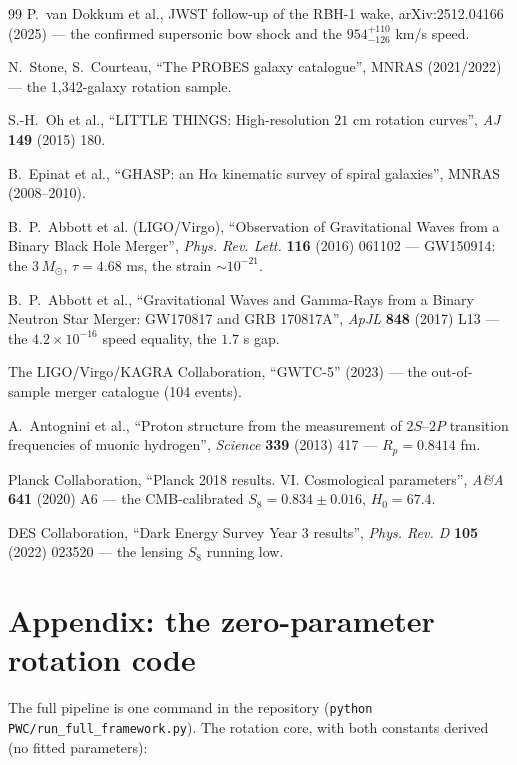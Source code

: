 \documentclass[11pt, a4paper]{article}
\begin{document}
\begin{thebibliography}{99}
 P.~van Dokkum et al., JWST follow-up of the RBH-1 wake,
arXiv:2512.04166 (2025) --- the confirmed supersonic bow shock and the
$954^{+110}_{-126}$ km/s speed.

 N.~Stone, S.~Courteau, ``The PROBES galaxy catalogue'',
MNRAS (2021/2022) --- the 1,342-galaxy rotation sample.

 S.-H.~Oh et al., ``LITTLE THINGS: High-resolution
$21$ cm rotation curves'', \emph{AJ} \textbf{149} (2015) 180.

 B.~Epinat et al., ``GHASP: an H$\alpha$ kinematic survey of
spiral galaxies'', MNRAS (2008--2010).

 B.~P.~Abbott et al. (LIGO/Virgo), ``Observation of
Gravitational Waves from a Binary Black Hole Merger'', \emph{Phys. Rev. Lett.}
\textbf{116} (2016) 061102 --- GW150914: the $3\,M_\odot$, $\tau = 4.68$ ms,
the strain $\sim10^{-21}$.

 B.~P.~Abbott et al., ``Gravitational Waves and Gamma-Rays
from a Binary Neutron Star Merger: GW170817 and GRB 170817A'',
\emph{ApJL} \textbf{848} (2017) L13 --- the $4.2\times10^{-16}$ speed equality,
the $1.7$ s gap.

 The LIGO/Virgo/KAGRA Collaboration, ``GWTC-5'' (2023) --- the
out-of-sample merger catalogue (104 events).

 A.~Antognini et al., ``Proton structure from the
measurement of $2S$--$2P$ transition frequencies of muonic hydrogen'',
\emph{Science} \textbf{339} (2013) 417 --- $R_p = 0.8414$ fm.

 Planck Collaboration, ``Planck 2018 results. VI. Cosmological
parameters'', \emph{A\&A} \textbf{641} (2020) A6 --- the CMB-calibrated
$S_8 = 0.834 \pm 0.016$, $H_0 = 67.4$.

 DES Collaboration, ``Dark Energy Survey Year 3 results'',
\emph{Phys. Rev. D} \textbf{105} (2022) 023520 --- the lensing $S_8$ running
low.

\end{thebibliography}

\newpage
\appendix
\section{Appendix: the zero-parameter rotation code}
\label{app:code}
The full pipeline is one command in the repository
(\texttt{python PWC/run\_full\_framework.py}). The rotation core, with both
constants derived (no fitted parameters):
\end{document}
